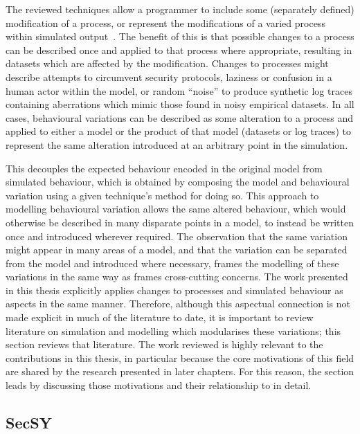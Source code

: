 The reviewed techniques allow a programmer to include some (separately defined)
modification of a process, or represent the modifications of a varied process
within simulated output~\cite{stocker2013secsy,stocker2014secsy}. The benefit of
this is that possible changes to a process can be described once and applied to
that process where appropriate, resulting in datasets which are affected by the
modification. Changes to processes might describe attempts to circumvent
security protocols, laziness or confusion in a human actor within the model, or
random ``noise'' to produce synthetic log traces containing aberrations which
mimic those found in noisy empirical datasets. In all cases, behavioural
variations can be described as some alteration to a process and applied to
either a model or the product of that model (datasets or log traces) to
represent the same alteration introduced at an arbitrary point in the
simulation.

This decouples the expected behaviour encoded in the original model from
simulated behaviour, which is obtained by composing the model and behavioural
variation using a given technique's method for doing so. This approach to
modelling behavioural variation allows the same altered behaviour, which would
otherwise be described in many disparate points in a model, to instead be
written once and introduced wherever required. The observation that the same
variation might appear in many areas of a model, and that the variation can be
separated from the model and introduced where necessary, frames the modelling of
these variations in the same way as \aspectorientation{} frames cross-cutting
concerns. The work presented in this thesis explicitly applies changes to
processes and simulated behaviour as aspects in the same manner. Therefore,
although this aspectual connection is not made explicit in much of the
literature to date, it is important to review literature on simulation and
modelling which modularises these variations; this section reviews that
literature. The work reviewed is highly relevant to the contributions in this
thesis, in particular because the core motivations of this field are shared by
the research presented in later chapters. For this reason, the section leads
by discussing those motivations and their relationship to
\aspectorientation{} in detail.


\subsection{SecSY}

